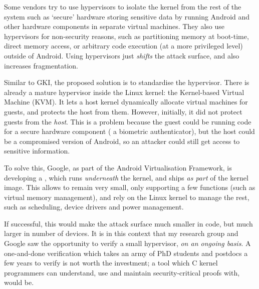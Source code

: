 Some vendors try to use hypervisors to isolate the kernel from the rest of the
system \textemdash{} such as `secure' hardware storing sensitive data
\textemdash{} by running Android and other hardware components in separate
virtual machines. They also use hypervisors for non-security reasons, such as
partitioning memory at boot-time, direct memory access, or arbitrary code
execution (at a more privileged level) outside of Android. Using hypervisors
just \emph{shifts} the attack
surface,
and also increases fragmentation.

Similar to GKI, the proposed solution is to standardise the hypervisor.
There is already a mature hypervisor inside the Linux kernel: the Kernel-based
Virtual Machine (KVM)\@. It lets a host kernel dynamically allocate virtual
machines for guests, and protects the host from them. However, initially, it
did not protect guests from the \emph{host}. This is a problem because the
guest could be running code for a secure hardware component (\eg{} a biometric
authenticator), but the host could be a compromised version of Android, so an
attacker could still get access to sensitive information.

To solve this, Google, as part of the Android Virtualisation
Framework,
is developing a , which
runs \emph{underneath} the kernel, and ships \emph{as part} of the
kernel image. This allows  to remain very small, only supporting a few
functions (such as virtual memory management), and rely on the Linux kernel to
manage the rest, such as scheduling, device drivers and power management.

If successful, this would make the attack surface much smaller in code, but
much larger in number of devices. It is in this context that my research group
and Google saw the opportunity to verify a small hypervisor, \emph{on an
ongoing basis}. A one-and-done verification which takes an army of PhD students
and postdocs a few years to verify is not worth the investment; a tool which C
kernel programmers can understand, use and maintain security-critical proofs
with, would be.


